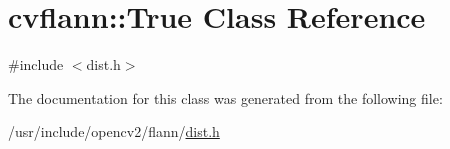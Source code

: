 \hypertarget{classcvflann_1_1True}{\section{cvflann\-:\-:True Class Reference}
\label{classcvflann_1_1True}
}


{\ttfamily \#include $<$dist.\-h$>$}



The documentation for this class was generated from the following file\-:\begin{DoxyCompactItemize}
\item 
/usr/include/opencv2/flann/\hyperlink{dist_8h}{dist.\-h}\end{DoxyCompactItemize}
